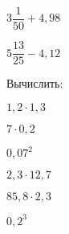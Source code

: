 \begin{class}[number=1]
\begin{listofex}
\begin{enumcols}[itemcolumns=6]
			\item \( 3\dfrac{1}{50}+4,98 \)
			\item \( 5\dfrac{13}{25}-4,12 \)
		\end{enumcols}
		\item Вычислить:
		\begin{enumcols}[itemcolumns=6]
			\item \( 1,2\cdot1,3 \)
			\item \( 7\cdot0,2 \)
			\item \( 0,07^2 \)
			\item \( 2,3\cdot12,7 \)
			\item \( 85,8\cdot2,3 \)
			\item \( 0,2^3 \)
		\end{enumcols}
	\end{listofex}
\end{class}
